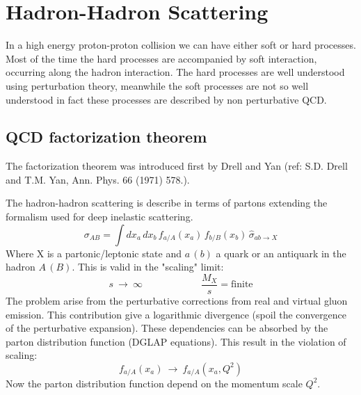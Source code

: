 %
%
%

%


\chapter{Hadron-Hadron Scattering}

In a high energy proton-proton collision we can have either soft or hard processes. Most of the time the hard processes are accompanied by soft interaction, occurring along the hadron interaction.
The hard processes are well understood using perturbation theory, meanwhile the soft processes are not so well understood in fact these processes are described by non perturbative QCD. 

\section{QCD factorization theorem}

The factorization theorem was introduced first by Drell and Yan (ref: S.D. Drell and T.M. Yan, Ann. Phys. 66 (1971) 578.).

The hadron-hadron scattering is describe in terms of partons extending the formalism used for deep inelastic scattering. 
\begin{equation}
\sigma_{AB}=\displaystyle\int dx_a\,dx_b\,f_{a/A}(x_a)\,f_{b/B}(x_b)\,\hat{\sigma}_{ab \rightarrow X}
\label{eq:factorization1}
\end{equation}
Where X is a partonic/leptonic state and $a\,(b)$ a quark or an antiquark in the hadron $A\,(B)$. This is valid in the "scaling" limit:
\begin{equation}
	s\ \longrightarrow\ \infty \qquad\qquad\qquad \frac{M_X}{s}=\text{finite}
\end{equation}
The problem arise from the perturbative corrections from real and virtual gluon emission. This contribution give a logarithmic divergence (spoil the convergence of the perturbative expansion). These dependencies can be absorbed by the parton distribution function (DGLAP equations). This result in the violation of scaling:
\begin{equation}
	f_{a/A}(x_a)\ \longrightarrow\ f_{a/A}(x_a, Q^2)
\end{equation}  
Now the parton distribution function depend on the momentum scale $Q^2$. 

